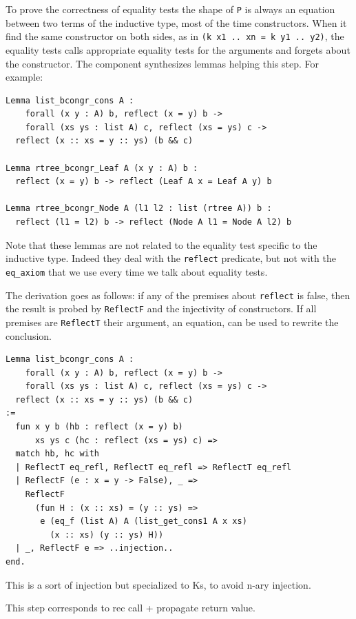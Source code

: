 \documentclass[sigplan,10pt,review]{acmart}\settopmatter{printfolios=true,printccs=false,printacmref=false}
\newcommand{\derive}[1]{\keys{#1}}
\begin{document}
\noindent
To prove the correctness of equality tests the shape of
\lstinline+P+ is always an equation between two terms of
the inductive type, most of the time constructors.
When it find the same constructor on both sides, as in
\lstinline+(k x1 .. xn = k y1 .. y2)+, the equality tests
calls appropriate equality tests for the arguments and forgets about
the constructor. The \derive{bcongr} component synthesizes lemmas
helping this step. For example:

\begin{lstlisting}
Lemma list_bcongr_cons A :
    forall (x y : A) b, reflect (x = y) b ->
    forall (xs ys : list A) c, reflect (xs = ys) c ->
  reflect (x :: xs = y :: ys) (b && c)

Lemma rtree_bcongr_Leaf A (x y : A) b :
  reflect (x = y) b -> reflect (Leaf A x = Leaf A y) b

Lemma rtree_bcongr_Node A (l1 l2 : list (rtree A)) b :
  reflect (l1 = l2) b -> reflect (Node A l1 = Node A l2) b
\end{lstlisting}

\noindent
Note that these lemmas are not related to the
equality test specific to the inductive type. Indeed they deal
with the \lstinline+reflect+ predicate, but not with the
\lstinline+eq_axiom+ that we use every time we talk about equality tests.

The derivation goes as follows: if any of the premises about
\lstinline+reflect+ is false, then the result is probed by
\lstinline+ReflectF+ and the injectivity of constructors.
If all premises are \lstinline+ReflectT+ their argument,
an equation, can be used to rewrite the conclusion.

\begin{lstlisting}
Lemma list_bcongr_cons A :
    forall (x y : A) b, reflect (x = y) b ->
    forall (xs ys : list A) c, reflect (xs = ys) c ->
  reflect (x :: xs = y :: ys) (b && c)
:=
  fun x y b (hb : reflect (x = y) b)
      xs ys c (hc : reflect (xs = ys) c) =>
  match hb, hc with
  | ReflectT eq_refl, ReflectT eq_refl => ReflectT eq_refl
  | ReflectF (e : x = y -> False), _ =>
    ReflectF
      (fun H : (x :: xs) = (y :: ys) =>
       e (eq_f (list A) A (list_get_cons1 A x xs)
         (x :: xs) (y :: ys) H))
  | _, ReflectF e => ..injection..
end.
\end{lstlisting}

This is a sort of injection but specialized to Ks, to avoid n-ary
injection.

This step corresponds to rec call + propagate return value.
\end{document}
